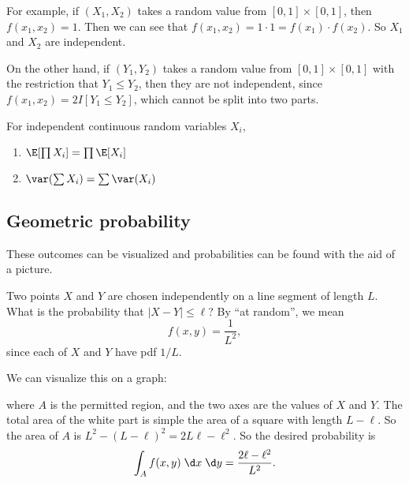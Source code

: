 \documentclass[a4paper]{article}
\begin{document}
\begin{eg}
  For example, if $(X_1, X_2)$ takes a random value from $[0, 1] \times [0, 1]$, then $f(x_1, x_2) = 1$. Then we can see that $f(x_1, x_2) = 1\cdot 1 = f(x_1)\cdot f(x_2)$. So $X_1$ and $X_2$ are independent.

  On the other hand, if $(Y_1, Y_2)$ takes a random value from $[0, 1] \times [0, 1]$ with the restriction that $Y_1 \leq Y_2$, then they are not independent, since $f(x_1, x_2) = 2 I[Y_1 \leq Y_2]$, which cannot be split into two parts.
\end{eg}

\begin{prop}
  For independent continuous random variables $X_i$,
  \begin{enumerate}
    \item $\E [\prod X_i] = \prod \E [X_i]$
    \item $\var (\sum X_i) = \sum \var (X_i)$
  \end{enumerate}
\end{prop}

\subsection{Geometric probability}These outcomes can be visualized and probabilities can be found with the aid of a picture.

\begin{eg}
  Two points $X$ and $Y$ are chosen independently on a line segment of length $L$. What is the probability that $|X - Y| \leq \ell$? By ``at random'', we mean
  \[
    f(x, y) = \frac{1}{L^2},
  \]
  since each of $X$ and $Y$ have pdf $1/L$.

  We can visualize this on a graph:
  \begin{center}
  \end{center}
  where $A$ is the permitted region, and the two axes are the values of $X$ and $Y$. The total area of the white part is simple the area of a square with length $L - \ell$. So the area of $A$ is $L^2 - (L - \ell)^2 = 2L\ell - \ell^2$. So the desired probability is
  \[
    \int_A f(x, y)\;\d x\;\d y = \frac{2\ell - \ell^2}{L^2}.
  \]
\end{eg}
\end{document}
